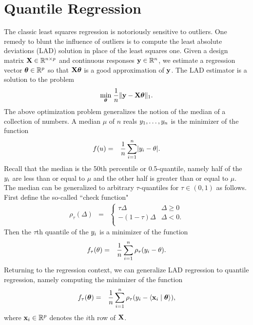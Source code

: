 \documentclass{article}
\newcommand{\Real}{\mathbb{R}}
\newcommand{\V}[1]{{\bm{\mathbf{\MakeLowercase{#1}}}}} %
\newcommand{\VE}[2]{\MakeLowercase{#1}_{#2}} %
\newcommand{\M}[1]{{\bm{\mathbf{\MakeUppercase{#1}}}}} %
\begin{document}
\section{Quantile Regression}

The classic least squares regression is notoriously sensitive to outliers. One remedy to blunt the influence of outliers is to compute the least absolute deviations (LAD) solution in place of the least squares one. Given a design matrix $\M{X} \in \Real^{n \times p}$ and continuous responses $\V{y} \in \Real^n$, we estimate a regression vector $\V{\theta} \in \Real^p$ so that $\M{X}\V{\theta}$ is a good approximation of $\V{y}$. The LAD estimator is a solution to the problem
\begin{eqnarray*}
\underset{\V{\theta}}{\min}\; \frac{1}{n}\lVert \V{y} - \M{X}\V{\theta} \rVert_1.
\end{eqnarray*}
The above optimization problem generalizes the notion of the median of a collection of numbers. A median $\mu$ of $n$ reals $\VE{y}{1}, \ldots, \VE{y}{n}$ is the minimizer of the function
\begin{eqnarray*}
f(u) & = & \frac{1}{n}\sum_{i=1}^n \lvert \VE{y}{i} - \theta \rvert.
\end{eqnarray*}
Recall that the median is the 50th percentile or 0.5-quantile, namely half of the $\VE{y}{i}$ are less than or equal to $\mu$ and the other half is greater than or equal to $\mu$. The median can be generalized to arbitrary $\tau$-quantiles for $\tau \in (0,1)$ as follows. First define the so-called ``check function"
\begin{eqnarray*}
\rho_\tau(\Delta) & = & \begin{cases}
\tau \Delta & \text{$\Delta \geq 0$} \\
-(1-\tau)\Delta & \text{$\Delta < 0$}. \\
\end{cases}
\end{eqnarray*}
Then the $\tau$th quantile of the $\VE{y}{i}$ is a minimizer of the function
\begin{eqnarray*}
f_\tau(\theta) & = & \frac{1}{n}\sum_{i=1}^n \rho_\tau(\VE{y}{i} - \theta).
\end{eqnarray*}
Returning to the regression context, we can generalize LAD regression to quantile regression, namely computing the minimizer of the function
\begin{eqnarray*}
f_\tau(\V{\theta}) & = & \frac{1}{n}\sum_{i=1}^n \rho_\tau(\VE{y}{i} - \langle \V{x}_i \mid \V{\theta} \rangle),
\end{eqnarray*}
where $\V{x}_i \in \Real^p$ denotes the $i$th row of $\M{X}$.
\end{document}
